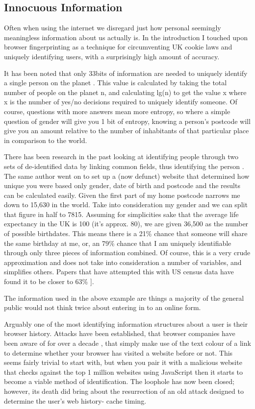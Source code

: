 \subsection{Innocuous Information}
Often when using the internet we disregard just how personal seemingly meaningless information about us actually is. In the introduction I touched upon browser fingerprinting as a technique for circumventing UK cookie laws and uniquely identifying users, with a surprisingly high amount of accuracy. 

It has been noted that only 33bits of information are needed to uniquely identify a single person on the planet \cite{research:33bits}. This value is calculated by taking the total number of people on the planet n, and calculating lg(n) to get the value x where x is the number of yes/no decisions required to uniquely identify someone. Of course, questions with more answers mean more entropy, so where a simple question of gender will give you 1 bit of entropy, knowing a person’s postcode will  give you an amount relative to the number of inhabitants of that particular place in comparison to the world.

There has been research in the past looking at identifying people through two sets of de-identified data by linking common fields, thus identifying the person \cite{research:lsweent}. The same author went on to set up a (now defunct) website that determined how unique you were based only gender, date of birth and postcode \cite{research:dpl} and the results can be calculated easily. Given the first part of my home postcode narrows me down to 15,630 in the world. Take into consideration my gender and we can split that figure in half to 7815. Assuming for simplicities sake that the average life expectancy in the UK is 100 (it’s approx. 80), we are given 36,500 as the number of possible birthdates. This means there is a 21\% chance that someone will share the same birthday at me, or, an 79\% chance that I am uniquely identifiable through only three pieces of information combined. Of course, this is a very crude approximation and does not take into consideration a number of variables, and simplifies others. Papers that have attempted this with US census data have found it to be closer to 63\% \cite{Golle:2006:RUS:1179601.1179615}].

The information used in the above example are things a majority of the general public would not think twice about entering in to an online form.

Arguably one of the most identifying information structures about a user is their browser history. Attacks have been established, that browser companies have been aware of for over a decade \cite{research:mozzy}, that simply make use of the text colour of a link to determine whether your browser has visited a website before or not. This seems fairly trivial to start with, but when you pair it with a malicious website that checks against the top 1 million websites using JavaScript then it starts to become a viable method of identification. The loophole has now been closed; however, its death did bring about the resurrection of an old attack designed to determine the user's web history- cache timing. 
